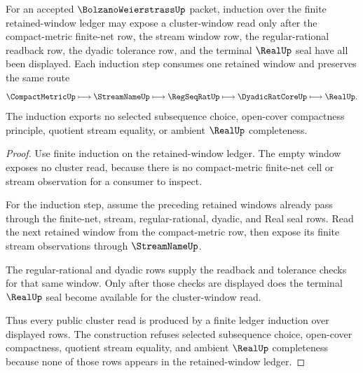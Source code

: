 \begin{theorem}
\label{thm:bolzano-weierstrass-retained-window-induction}
For an accepted $\BolzanoWeierstrassUp$ packet, induction over the finite retained-window ledger may expose a cluster-window read only after the compact-metric finite-net row, the stream window row, the regular-rational readback row, the dyadic tolerance row, and the terminal $\RealUp$ seal have all been displayed. Each induction step consumes one retained window and preserves the same route
$$
\CompactMetricUp \longmapsto \StreamNameUp \longmapsto \RegSeqRatUp \longmapsto \DyadicRatCoreUp \longmapsto \RealUp .
$$
The induction exports no selected subsequence choice, open-cover compactness principle, quotient stream equality, or ambient $\RealUp$ completeness.
\end{theorem}
\begin{proof}
Use finite induction on the retained-window ledger. The empty window exposes no cluster read, because there is no compact-metric finite-net cell or stream observation for a consumer to inspect.

For the induction step, assume the preceding retained windows already pass through the finite-net, stream, regular-rational, dyadic, and Real seal rows. Read the next retained window from the compact-metric row, then expose its finite stream observations through $\StreamNameUp$.

The regular-rational and dyadic rows supply the readback and tolerance checks for that same window. Only after those checks are displayed does the terminal $\RealUp$ seal become available for the cluster-window read.

Thus every public cluster read is produced by a finite ledger induction over displayed rows. The construction refuses selected subsequence choice, open-cover compactness, quotient stream equality, and ambient $\RealUp$ completeness because none of those rows appears in the retained-window ledger.
\end{proof}

